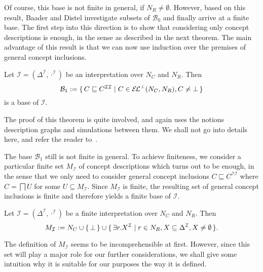 Of course, this base is not finite in general, \ie if $N_R \neq \emptyset$.  However,
based on this result, Baader and Distel investigate subsets of $\mathcal{B}_0$ and finally
arrive at a finite base.  The first step into this direction is to show that considering
only \ELbot concept descriptions is enough, in the sense as described in the next theorem.
The main advantage of this result is that we can now use induction over the premises of
general concept inclusions.

\begin{Theorem}
  \label{thm:Felix-base-B1}
  Let $\mathcal{I} = (\Delta^{\mathcal{I}}, \cdot^{\mathcal{I}})$ be an interpretation
  over $N_C$ and $N_R$.  Then
  \begin{equation}
    \label{eq:21}
    \mathcal{B}_1 := {\{\, C \sqsubseteq C^{\mathcal{I}\mathcal{I}} \mid C \in {\ensuremath{{\mathcal{E}\kern-.3ex\mathcal{L}}^\bot}}(N_C,
      N_R), C \neq \bot \,\}}
  \end{equation}
  is a base of $\mathcal{I}$.
\end{Theorem}

The proof of this theorem is quite involved, and again uses the notions \EL description
graphs and simulations between them.  We shall not go into details here, and refer the
reader to~\cite[Section 5.1.1]{Diss-Felix}.

The base $\mathcal{B}_1$ still is not finite in general.  To achieve finiteness, we
consider a particular finite set $M_{\mathcal{I}}$ of concept descriptions which turns out
to be enough, in the sense that we only need to consider general concept inclusions $C
\sqsubseteq C^{\mathcal{I}\mathcal{I}}$ where $C = \bigsqcap U$ for some $U \subseteq
M_{\mathcal{I}}$.  Since $M_{\mathcal{I}}$ is finite, the resulting set of general concept
inclusions is finite and therefore yields a finite base of $\mathcal{I}$.

\begin{Definition}[$M_{\mathcal{I}}$]
  \label{def:M_I}
  Let $\mathcal{I} = (\Delta^{\mathcal{I}}, \cdot^{\mathcal{I}})$ be a finite
  interpretation over $N_C$ and $N_R$.  Then
  \begin{equation*}
    M_{\mathcal{I}} := N_C \cup {\ensuremath{\{\, \bot \,\}}} \cup {\ensuremath{\{\, \exists r. X^{\mathcal{I}} \mid
      r \in N_R, X \subseteq \Delta^{\mathcal{I}}, X \neq \emptyset \,\}}}.
  \end{equation*}
\end{Definition}

The definition of $M_{\mathcal{I}}$ seems to be incomprehensible at first.  However, since
this set will play a major role for our further considerations, we shall give some
intuition why it is suitable for our purposes the way it is defined.

